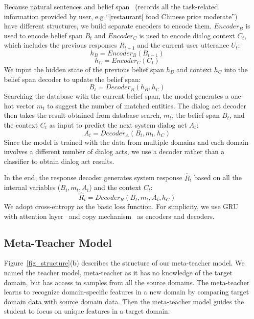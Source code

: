 \documentclass[letterpaper]{article} %
\begin{document}
Because natural sentences and belief span~\citep{lei2018sequicity} (records all the task-related information provided by user, e.g ``[restaurant] food Chinese price moderate'') have different structures, we build  separate encoders to encode them. $Encoder_B$ is used to encode belief span $B_t$ and $Encoder_C$ is used to encode dialog context $C_t$, which includes the previous responses $R_{t-1}$ and  the current user utterance $U_t$:
            $$h_B=Encoder_B(B_{t-1})$$
            $$h_C=Encoder_C(C_t)$$
We input the hidden state of the previous belief span $h_B$ and context $h_C$ into the belief span decoder to update the belief span:
            $${B}_t=Decoder_B(h_B,h_C)$$
Searching the database with the current belief span, the model generates a one-hot vector $m_t$ to suggest the number of matched entities. 
%
The dialog act decoder then takes the result obtained from database search, $m_t$, the belief span $B_t$, and the context $C_t$ as input to predict the next system dialog act $A_t$:
            $${A}_t=Decoder_A(B_t,m_t,h_C)$$
Since the model is trained with the data from multiple domains and each domain involves a different number of dialog acts, we use a decoder rather than a classifier to obtain dialog act results.
    
In the end, the response decoder generates system response $\hat{R}_t$ based on all the internal variables ($B_t,m_t,A_t$) and the context $C_t$:
            $$\hat{R}_t=Decoder_R(B_t,m_t,A_t,h_C)$$
We adopt cross-entropy as the basic loss function.
For simplicity, we use GRU~\citep{cho2014learning} with attention layer~\citep{bahdanau2014neural} and copy mechanism~\citep{Gu2016IncorporatingCM} as encoders and decoders.
    
    
    


\subsection*{Meta-Teacher Model}
Figure~\ref{fig_structure}(b) describes the structure of our meta-teacher model. We named the teacher model, meta-teacher as it has no knowledge of the target domain, but has access to samples from all the source domains.
The meta-teacher learns to recognize domain-specific features in a new domain by comparing target domain data with source domain data. Then the meta-teacher model guides the student to focus on unique features in a target domain.
\end{document}
